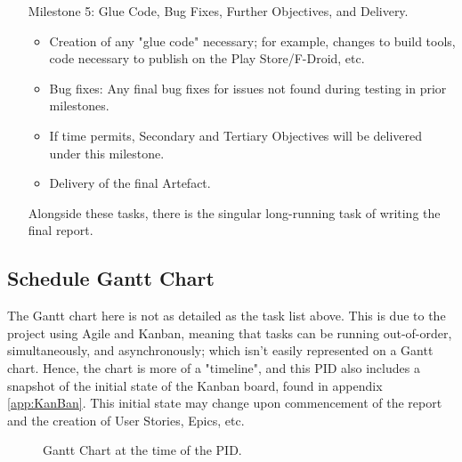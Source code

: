 \documentclass[11pt, a4paper, notitlepage]{report}
\begin{document}
\begin{enumerate}
    \item [Milestone 5:]Glue Code, Bug Fixes, Further Objectives, and Delivery.
    \begin{itemize}
        \item Creation of any "glue code" necessary; for example, changes to 
        build tools, code necessary to publish on the Play Store/F-Droid, etc.
        \item Bug fixes: Any final bug fixes for issues not found during 
        testing in prior milestones.
        \item If time permits, Secondary and Tertiary Objectives will be 
        delivered under this milestone.
        \item Delivery of the final Artefact.
    \end{itemize}

Alongside these tasks, there is the singular long-running task of writing the 
final report.
\end{enumerate}
\subsection{Schedule Gantt Chart}\label{subsec:schedGanttCt}
The Gantt chart here is not as detailed as the task list above. This is due to 
the project using Agile and Kanban, meaning that tasks can be running 
out-of-order, simultaneously, and asynchronously; which isn't easily 
represented on a Gantt chart. Hence, the chart is more of a "timeline", and 
this PID also includes a snapshot of the initial state of the Kanban board, 
found in appendix \ref{app:KanBan}. This initial state may change upon 
commencement of the report and the creation of User Stories, Epics, etc.
\begin{landscape}
    \begin{figure}[h]
        \centering
        \caption{Gantt Chart at the time of the PID.}
        \label{fig:ganttchart}
    \end{figure}
\end{landscape}
\end{document}
